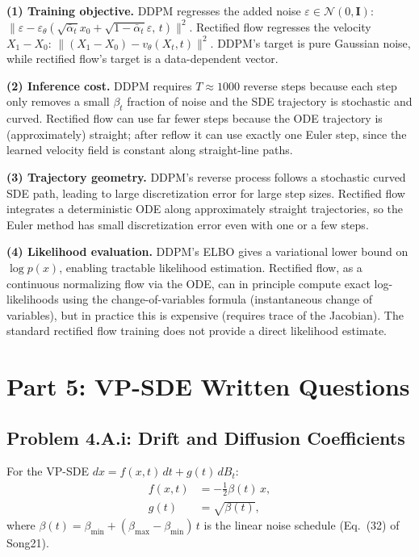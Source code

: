 \documentclass[11pt]{article}
\newcommand{\N}{\mathcal{N}}
\newcommand{\abar}{\bar{\alpha}}
\newcommand{\epsth}{\varepsilon_\theta}
\begin{document}
\textbf{(1) Training objective.}
DDPM regresses the added noise $\varepsilon\in\N(0,\mathbf{I})$: $\|\varepsilon-\epsth(\sqrt{\abar_t}x_0+\sqrt{1-\abar_t}\varepsilon,\,t)\|^2$.
Rectified flow regresses the velocity $X_1-X_0$: $\|(X_1-X_0)-v_\theta(X_t,t)\|^2$.
DDPM's target is pure Gaussian noise, while rectified flow's target is a data-dependent vector.

\textbf{(2) Inference cost.}
DDPM requires $T\approx1000$ reverse steps because each step only removes a small $\beta_t$ fraction of noise and the SDE trajectory is stochastic and curved.  Rectified flow can use far fewer steps because the ODE trajectory is (approximately) straight; after reflow it can use exactly one Euler step, since the learned velocity field is constant along straight-line paths.

\textbf{(3) Trajectory geometry.}
DDPM's reverse process follows a stochastic curved SDE path, leading to large discretization error for large step sizes.  Rectified flow integrates a deterministic ODE along approximately straight trajectories, so the Euler method has small discretization error even with one or a few steps.

\textbf{(4) Likelihood evaluation.}
DDPM's ELBO gives a variational lower bound on $\log p(x)$, enabling tractable likelihood estimation.  Rectified flow, as a continuous normalizing flow via the ODE, can in principle compute exact log-likelihoods using the change-of-variables formula (instantaneous change of variables), but in practice this is expensive (requires trace of the Jacobian).  The standard rectified flow training does not provide a direct likelihood estimate.

\section{Part 5: VP-SDE Written Questions}

\subsection{Problem 4.A.i: Drift and Diffusion Coefficients}

For the VP-SDE $dx = f(x,t)\,dt + g(t)\,dB_t$:
\begin{align}
f(x,t) &= -\tfrac{1}{2}\beta(t)\,x, \\
g(t)   &= \sqrt{\beta(t)},
\end{align}
where $\beta(t)=\beta_\mathrm{min}+(\beta_\mathrm{max}-\beta_\mathrm{min})\,t$ is the
linear noise schedule (Eq.~(32) of Song21).
\end{document}
